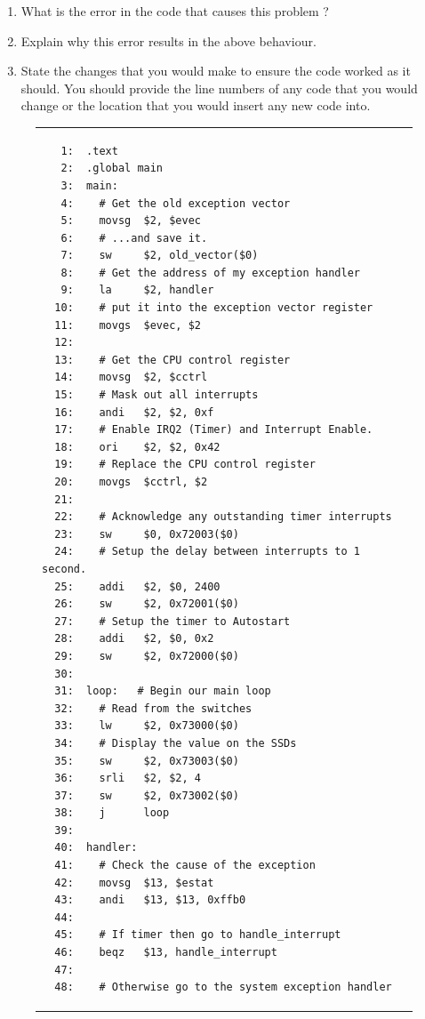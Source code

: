 \documentclass[a4paper,10pt]{article}
\begin{document}
\begin{enumerate}
\label{ques:badack}

\begin{enumerate}
\item What is the error in the code that causes this problem ?

\item Explain why this error results in the above behaviour.

\item State the changes that you would make to ensure the code worked
as it should. You should provide the line numbers of any code that you
would change or the location that you would insert any new code into.

\end{enumerate}

\begin{figure}[p]
\begin{footnotesize}
\begin{center}
\begin{tabular}{|p{12cm}|}
\hline
\begin{verbatim}
   1:  .text
   2:  .global main
   3:  main:
   4:    # Get the old exception vector
   5:    movsg  $2, $evec
   6:    # ...and save it.
   7:    sw     $2, old_vector($0)
   8:    # Get the address of my exception handler
   9:    la     $2, handler
  10:    # put it into the exception vector register
  11:    movgs  $evec, $2
  12:
  13:    # Get the CPU control register
  14:    movsg  $2, $cctrl
  15:    # Mask out all interrupts
  16:    andi   $2, $2, 0xf
  17:    # Enable IRQ2 (Timer) and Interrupt Enable.
  18:    ori    $2, $2, 0x42
  19:    # Replace the CPU control register
  20:    movgs  $cctrl, $2
  21:    
  22:    # Acknowledge any outstanding timer interrupts
  23:    sw     $0, 0x72003($0)
  24:    # Setup the delay between interrupts to 1 second.
  25:    addi   $2, $0, 2400
  26:    sw     $2, 0x72001($0)
  27:    # Setup the timer to Autostart 
  28:    addi   $2, $0, 0x2
  29:    sw     $2, 0x72000($0)
  30:    
  31:  loop:   # Begin our main loop
  32:    # Read from the switches
  33:    lw     $2, 0x73000($0)
  34:    # Display the value on the SSDs
  35:    sw     $2, 0x73003($0)
  36:    srli   $2, $2, 4
  37:    sw     $2, 0x73002($0)
  38:    j      loop
  39:    
  40:  handler:
  41:    # Check the cause of the exception
  42:    movsg  $13, $estat
  43:    andi   $13, $13, 0xffb0
  44:    
  45:    # If timer then go to handle_interrupt
  46:    beqz   $13, handle_interrupt
  47:    
  48:    # Otherwise go to the system exception handler

\end{verbatim}
\end{tabular}
\end{center}
\end{footnotesize}
\end{figure}
\end{enumerate}
\end{document}
